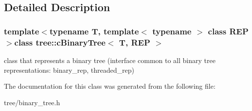 \subsection{Detailed Description}
\subsubsection*{template$<$typename T, template$<$ typename $>$ class R\-E\-P$>$class tree\-::c\-Binary\-Tree$<$ T, R\-E\-P $>$}

class that represents a binary tree (interface common to all binary tree representations\-: binary\-\_\-rep, threaded\-\_\-rep) 

The documentation for this class was generated from the following file\-:\begin{DoxyCompactItemize}
\item 
tree/binary\-\_\-tree.\-h\end{DoxyCompactItemize}
